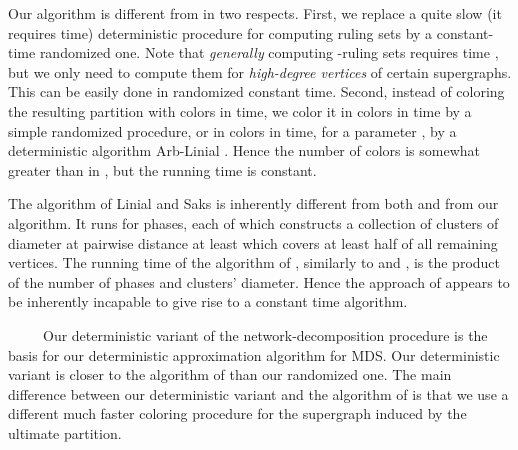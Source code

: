 \documentclass[11pt]{article}
\begin{document}
Our algorithm is different from \cite{AGLP89,PS95} in two respects. First, we replace a quite slow (it requires  time) deterministic procedure for computing ruling sets by a constant-time randomized one. Note that {\em generally} computing -ruling sets requires  time \cite{L92}, but we only need to compute them for {\em high-degree vertices} of certain supergraphs. This can be easily done in randomized constant time. Second, instead of coloring the resulting partition with  colors in  time, we color it in  colors in  time by a simple randomized procedure, or in  colors in  time, for a parameter , by a deterministic algorithm Arb-Linial \cite{BE08}. Hence the number of colors is somewhat greater than in \cite{AGLP89,PS95}, but the running time is constant.

The algorithm of Linial and Saks \cite{LS92} is inherently different from both \cite{AGLP89,PS95} and from our algorithm. It runs for  phases, each of which constructs a collection of clusters of diameter  at pairwise distance at least  which covers at least half of all remaining vertices. The running time of the algorithm of \cite{LS92}, similarly to \cite{AGLP89} and \cite{PS95}, is the product of the number of phases and clusters' diameter. Hence the approach of \cite{LS92} appears to be inherently incapable to give rise to a constant time algorithm.

\noindent \ \ \ \ \ Our deterministic variant of the network-decomposition procedure is the basis for our deterministic approximation algorithm for MDS. Our deterministic variant is closer to the algorithm of \cite{AGLP89} than our randomized one. The main difference between our deterministic variant and the algorithm of \cite{AGLP89} is that we use a different much faster coloring procedure for the supergraph induced by the ultimate partition.
\end{document}
